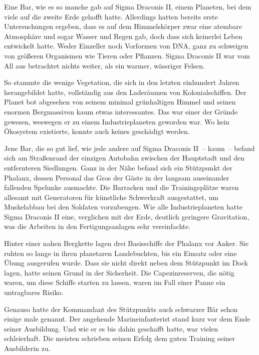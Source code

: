 Eine Bar, wie es so manche gab auf Sigma Draconis II, einem Planeten, bei dem viele auf die zweite Erde gehofft hatte. Allerdings hatten bereits erste Untersuchungen ergeben, dass es auf dem Himmelskörper zwar eine atembare Atmosphäre und sogar Wasser und Regen gab, doch dass sich keinerlei Leben entwickelt hatte. Weder Einzeller noch Vorformen von DNA, ganz zu schweigen von größeren Organismen wie Tieren oder Pflanzen. Sigma Draconis II war vom All aus betrachtet nichts weiter, als ein warmer, wässriger Felsen.

\par

So stammte die wenige Vegetation, die sich in den letzten einhundert Jahren herangebildet hatte, vollständig aus den Laderäumen von Kolonialschiffen. Der Planet bot abgesehen von seinem minimal grünhaltigen Himmel und seinen enormen Bergmassiven kaum etwas interessantes. Das war einer der Gründe gewesen, weswegen er zu einem Industrieplaneten geworden war. Wo kein Ökosystem existierte, konnte auch keines geschädigt werden.

\par

Jene Bar, die so gut lief, wie jede andere auf Sigma Draconis II~-- kaum~-- befand sich am Straßenrand der einzigen Autobahn zwischen der Hauptstadt und den entfernteren Siedlungen. Ganz in der Nähe befand sich ein Stützpunkt der Phalanx, dessen Personal das Gros der Gäste in der langsam auseinander fallenden Spelunke ausmachte. Die Barracken und die Trainingsplätze waren allesamt mit Generatoren für künstliche Schwerkraft ausgestattet, um Muskelabbau bei den Soldaten vorzubeugen. Wie alle Industrieplaneten hatte Sigma Draconis II eine, verglichen mit der Erde, deutlich geringere Gravitation, was die Arbeiten in den Fertigungsanlagen sehr vereinfachte.

\par

Hinter einer nahen Bergkette lagen drei Basisschiffe der Phalanx vor Anker. Sie ruhten so lange in ihren planetaren Landebuchten, bis ein Einsatz oder eine Übung ausgerufen wurde. Dass sie nicht direkt neben dem Stützpunkt im Dock lagen, hatte seinen Grund in der Sicherheit. Die Capezinreserven, die nötig waren, um diese Schiffe starten zu lassen, waren im Fall einer Panne ein untragbares Risiko.

\par

Genauso hatte der Kommandant des Stützpunkts auch schwarzer Bär schon einige male genannt. Der angehende Marineinfanterist stand kurz vor dem Ende seiner Ausbildung. Und wie er es bis dahin geschafft hatte, war vielen schleierhaft. Die meisten schrieben seinen Erfolg dem guten Training seiner Ausbilderin zu.

